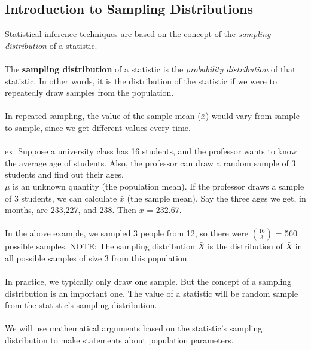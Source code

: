 \documentclass[12pt, a4paper]{article}
\begin{document}
	\subsection{Introduction to Sampling Distributions}
	Statistical inference techniques are based on the concept of the \textit{sampling distribution} of a statistic. \\~\\
	The \textbf{sampling distribution} of a statistic is the \textit{probability distribution} of that statistic. In other words, it is the distribution of the statistic if we were to repeatedly draw samples from the population. \\~\\
	In repeated sampling, the value of the sample mean ($\bar{x}$) would vary from sample to sample, since we get different values every time. \\~\\
	ex: Suppose a university class has 16 students, and the professor wants to know the average age of students. Also, the professor can draw a random sample of 3 students and find out their ages. \\
	$\mu$ is an unknown quantity (the population mean). If the professor draws a sample of 3 students, we can calculate $\bar{x}$ (the sample mean). Say the three ages we get, in months, are 233,227, and 238. Then $\bar{x}$ = 232.67. \\~\\
	In the above example, we sampled 3 people from 12, so there were $\binom{16}{3}$ = 560 possible samples. NOTE: The sampling distribution $\bar{X}$ is the distribution of $\bar{X}$ in all possible samples of size 3 from this population. \\~\\
	In practice, we typically only draw one sample. But the concept of a sampling distribution is an important one. The value of a statistic will be random sample from the statistic's sampling distribution. \\~\\
	We will use mathematical arguments based on the statistic's sampling distribution to make statements about population parameters. \\~\\
	
\end{document}
